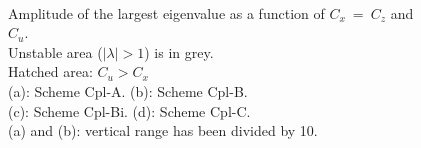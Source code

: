 \documentclass[a4paper,11pt]{article}
\begin{document}
\begin{figure}[!ht]
   \centering
   \quad
   \\
   \quad
   \caption{Amplitude of the largest eigenvalue as a function of $C_x\ =\ C_z$ and $C_u$.\\
       Unstable area ($\mid\lambda\mid >1$) is in grey.\\
       Hatched area: $C_u > C_x$ \\
       (a): Scheme Cpl-A. (b): Scheme Cpl-B.\\
       (c): Scheme Cpl-Bi. (d): Scheme Cpl-C.\\
       (a) and (b): vertical range has been divided by 10.}
   \label{Figstabadvsch}
\end{figure}
\end{document}
